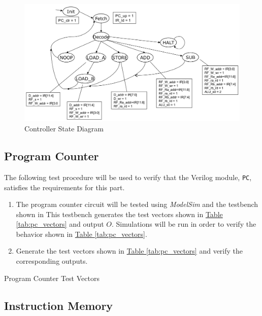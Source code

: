 \begin{figure}
    \includegraphics[width=\textwidth]{images/state_diagram.png}
    \caption{Controller State Diagram \label{fig:state_diagram}}
\end{figure}


\subsection{Program Counter} %
\label{sub:program_counter}

The following test procedure will be used to verify that the Verilog module, \verb|PC|, satisfies the requirements for this part.

\begin{enumerate}
    \item The program counter circuit will be tested using \emph{ModelSim} and the testbench shown in %
    This testbench generates the test vectors shown in \hyperref[tab:pc_vectors]{Table \ref*{tab:pc_vectors}} and output $O$.
    Simulations will be run in order to verify the behavior shown in \hyperref[tab:pc_vectors]{Table \ref*{tab:pc_vectors}}.
    \item Generate the test vectors shown in \hyperref[tab:pc_vectors]{Table \ref*{tab:pc_vectors}}
    and verify the corresponding outputs.
\end{enumerate}

\begin{table}[htbp]
    \centering
    \caption{Program Counter Test Vectors\label{tab:pc_vectors}}
\end{table}


\subsection{Instruction Memory} %
\label{sub:instruction_memory}


